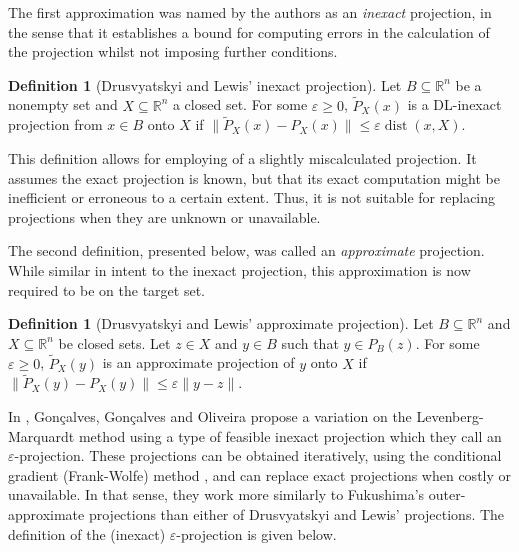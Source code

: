 \documentclass[smallextended,numbook,nospthms]{svjour3}
\theoremstyle{plain}
\theoremstyle{definition}
\newtheorem{definition}[theorem]{Definition}
\def\RR{\mathds R}
\DeclareMathOperator{\dist}{dist}
\begin{document}
The first approximation was named by the authors as an \emph{inexact} projection, in the sense that it establishes a bound for computing errors in the calculation of the projection whilst not imposing further conditions.

\begin{definition}[Drusvyatskyi and Lewis' inexact projection]
	Let $B \subseteq \RR^{n}$ be a nonempty set and $X \subseteq \RR^{n}$ a closed set. For some $\varepsilon \geq 0$, $\tilde{P}_{X}(x)$ is a DL-inexact projection from $x \in B$ onto $X$ if $\|\tilde{P}_{X}(x)-P_{X}(x)\| \leq \varepsilon \dist(x,X)$.
\end{definition}

This definition allows for employing of a slightly miscalculated projection. It assumes the exact projection is known, but that its exact computation might be inefficient or erroneous to a certain extent. Thus, it is not suitable for replacing projections when they are unknown or unavailable.

The second definition, presented below, was called an \emph{approximate} projection. While similar in intent to the inexact projection, this approximation is now required to be on the target set.

\begin{definition}[Drusvyatskyi and Lewis' approximate projection]
	Let $B \subseteq \RR^{n}$ and $X \subseteq \RR^{n}$ be closed sets. Let $z \in X$ and $y \in B$ such that $y \in P_{B}(z)$. For some $\varepsilon \geq 0$, $\tilde{P}_{X}(y)$ is an approximate projection of $y$ onto $X$ if  $\|\tilde{P}_{X}(y)-P_{X}(y)\| \leq \varepsilon \|y - z\|$.
\end{definition}

In \cite{Goncalves:2019}, Gonçalves, Gonçalves and Oliveira propose a variation on the Levenberg-Marquardt method using a type of feasible inexact projection which they call an $\varepsilon$-projection. These projections can be obtained iteratively, using the conditional gradient (Frank-Wolfe) method \cite{Frank:1956, Jaggi:2013}, and can replace exact projections when costly or unavailable. In that sense, they work more similarly to Fukushima's outer-approximate projections than either of Drusvyatskyi and Lewis' projections. The definition of the (inexact) $\varepsilon$-projection is given below.
\end{document}

